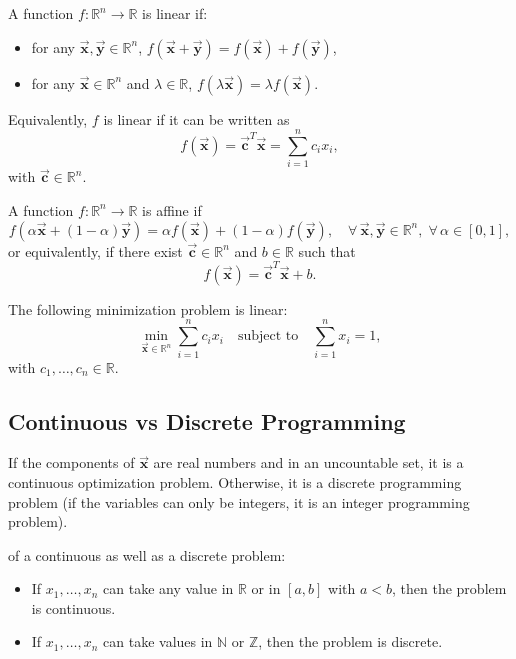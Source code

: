 \documentclass[9pt, headings=standardclasses, parskip=half]{scrartcl}
\renewcommand{\emph}[1]{\textcolor{mypurple}{#1}}
\newcommand{\vect}[1]{\vec{\boldsymbol{#1}}}
\begin{document}
\begin{definition}
A function \(f:\mathbb{R}^{n}\rightarrow\mathbb{R}\) is \emph{linear} if:
\begin{itemize}
	\item for any \(\vect{x},\vect{y}\in\mathbb{R}^{n}\), \(f(\vect{x}+\vect{y})=f(\vect{x})+f(\vect{y})\),
	\item for any \(\vect{x}\in\mathbb{R}^{n}\) and \(\lambda\in\mathbb{R}\), \(f(\lambda\vect{x})=\lambda f(\vect{x})\).
\end{itemize}
Equivalently, \(f\) is linear if it can be written as
\[
f(\vect{x})=\vect{c}^{T}\vect{x}=\sum_{i=1}^{n} c_{i}x_{i},
\]
with \(\vect{c}\in\mathbb{R}^{n}\).
\end{definition}

\begin{definition}\label{def:affine_function}
A function \(f:\mathbb{R}^{n}\rightarrow\mathbb{R}\) is \emph{affine} if
\[
f(\alpha\vect{x}+(1-\alpha)\vect{y})=\alpha f(\vect{x})+(1-\alpha)f(\vect{y}),\quad \forall\, \vect{x},\vect{y}\in\mathbb{R}^{n},\; \forall\, \alpha\in[0,1],
\]
or equivalently, if there exist \(\vect{c}\in\mathbb{R}^{n}\) and \(b\in\mathbb{R}\) such that
\[
f(\vect{x})=\vect{c}^{T}\vect{x}+b.
\]
\end{definition}

\begin{example}
The following minimization problem is linear:
\[
\min_{\vect{x}\in\mathbb{R}^{n}} \sum_{i=1}^{n} c_{i}x_{i} \quad \text{subject to} \quad \sum_{i=1}^{n} x_{i}=1,
\]
with \(c_{1}, \ldots, c_{n}\in\mathbb{R}\).
\end{example}

\subsection{Continuous vs Discrete Programming}

If the components of \(\vect{x}\) are real numbers and in an uncountable set, it is a \emph{continuous} optimization problem. Otherwise, it is a \emph{discrete} programming problem (if the variables can only be integers, it is an \emph{integer} programming problem).

\begin{example}
of a continuous as well as a discrete problem:
\begin{itemize}
	\item If \(x_{1},\ldots, x_{n}\) can take any value in \(\mathbb{R}\) or in \([a,b]\) with \(a<b\), then the problem is continuous.
	\item If \(x_{1},\ldots, x_{n}\) can take values in \(\mathbb{N}\) or \(\mathbb{Z}\), then the problem is discrete.
\end{itemize}
\end{example}
\end{document}
